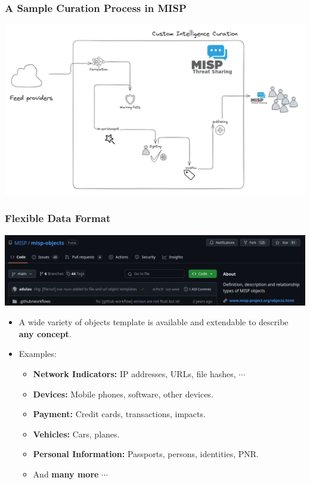 \begin{frame}
    \frametitle{A Sample Curation Process in MISP}
    \begin{center}
        \includegraphics[width=0.84\linewidth]{curation.png}
    \end{center}
\end{frame}

\begin{frame}
    \frametitle{Flexible Data Format}
    \begin{center}
        \includegraphics[width=0.99\linewidth]{misp-objects-repo.png}
    \end{center}
    \begin{itemize}
        \item A wide variety of objects template is available and extendable to describe \textbf{any concept}.
        \item Examples:
        \begin{itemize}
            \item \textbf{Network Indicators:} IP addresses, URLs, file hashes, $\cdots$
            \item \textbf{Devices:} Mobile phones, software, other devices.
            \item \textbf{Payment:} Credit cards, transactions, impacts.
            \item \textbf{Vehicles:} Cars, planes.
            \item \textbf{Personal Information:} Passports, persons, identities, PNR.
            \item And \textbf{many more} $\cdots$
        \end{itemize}
    \end{itemize}
\end{frame}

